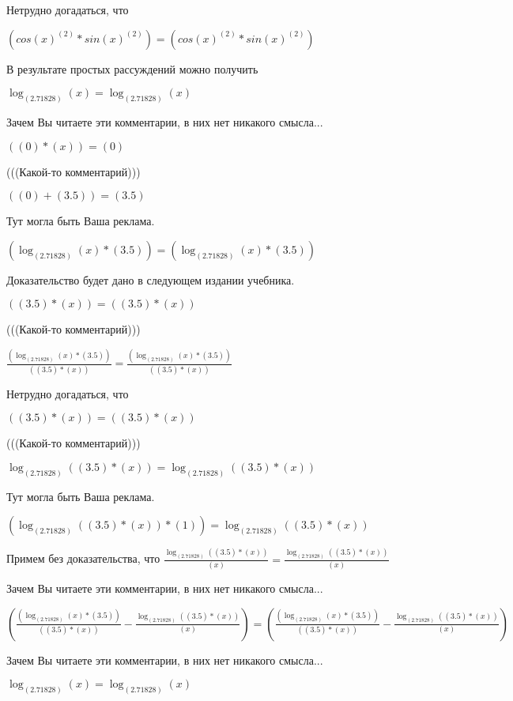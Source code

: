 \documentclass[12pt,a4paper,fleqn]{article}
\theoremstyle{definition}
\begin{document}
Нетрудно догадаться, что

$(cos{( x )}^{( 2 )} * sin{( x )}^{( 2 )}) = (cos{( x )}^{( 2 )} * sin{( x )}^{( 2 )})$

В результате простых рассуждений можно получить

$\log_{( 2.71828 )}{( x )} = \log_{( 2.71828 )}{( x )}$

Зачем Вы читаете эти комментарии, в них нет никакого смысла...

$(( 0 ) * ( x )) = ( 0 )$

(((Какой-то комментарий)))

$(( 0 ) + ( 3.5 )) = ( 3.5 )$

Тут могла быть Ваша реклама.

$(\log_{( 2.71828 )}{( x )} * ( 3.5 )) = (\log_{( 2.71828 )}{( x )} * ( 3.5 ))$

Доказательство будет дано в следующем издании учебника.

$(( 3.5 ) * ( x )) = (( 3.5 ) * ( x ))$

(((Какой-то комментарий)))

$\frac{(\log_{( 2.71828 )}{( x )} * ( 3.5 ))}{(( 3.5 ) * ( x ))}
 = \frac{(\log_{( 2.71828 )}{( x )} * ( 3.5 ))}{(( 3.5 ) * ( x ))}
$

Нетрудно догадаться, что

$(( 3.5 ) * ( x )) = (( 3.5 ) * ( x ))$

(((Какой-то комментарий)))

$\log_{( 2.71828 )}{(( 3.5 ) * ( x ))} = \log_{( 2.71828 )}{(( 3.5 ) * ( x ))}$

Тут могла быть Ваша реклама.

$(\log_{( 2.71828 )}{(( 3.5 ) * ( x ))} * ( 1 )) = \log_{( 2.71828 )}{(( 3.5 ) * ( x ))}$

Примем без доказательства, что
$\frac{\log_{( 2.71828 )}{(( 3.5 ) * ( x ))}}{( x )}
 = \frac{\log_{( 2.71828 )}{(( 3.5 ) * ( x ))}}{( x )}
$

Зачем Вы читаете эти комментарии, в них нет никакого смысла...

$(\frac{(\log_{( 2.71828 )}{( x )} * ( 3.5 ))}{(( 3.5 ) * ( x ))}
 - \frac{\log_{( 2.71828 )}{(( 3.5 ) * ( x ))}}{( x )}
) = (\frac{(\log_{( 2.71828 )}{( x )} * ( 3.5 ))}{(( 3.5 ) * ( x ))}
 - \frac{\log_{( 2.71828 )}{(( 3.5 ) * ( x ))}}{( x )}
)$

Зачем Вы читаете эти комментарии, в них нет никакого смысла...

$\log_{( 2.71828 )}{( x )} = \log_{( 2.71828 )}{( x )}$
\end{document}
